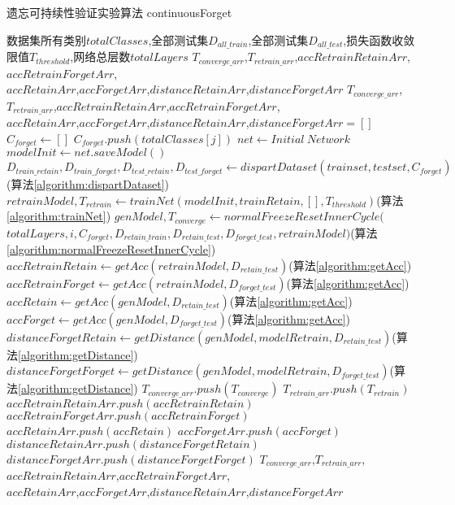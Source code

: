 \begin{algorithm}
	\renewcommand{\algorithmicrequire}{\textbf{Input:}}
	\renewcommand{\algorithmicensure}{\textbf{Output:}}
	\caption{遗忘可持续性验证实验算法 continuousForget}
	\label{algorithm:continuousForget}
	\begin{algorithmic}[1]
        \REQUIRE 数据集所有类别$totalClasses$,全部测试集$D_{all\_train}$,全部测试集$D_{all\_test}$,损失函数收敛限值$T_{threshold}$,网络总层数$totalLayers$
        \ENSURE  $T_{converge\_arr}$,$T_{retrain\_arr}$,$accRetrainRetainArr$,$accRetrainForgetArr$,\\$accRetainArr$,$accForgetArr$,$distanceRetainArr$,$distanceForgetArr$
        \STATE $T_{converge\_arr}$,$T_{retrain\_arr}$,$accRetrainRetainArr$,$accRetrainForgetArr$,\\$accRetainArr$,$accForgetArr$,$distanceRetainArr$,$distanceForgetArr$$ = []$
            \STATE $C_{forget} \gets []$
                \STATE $C_{forget}.push(totalClasses[j])$
            \ENDFOR
            \STATE $net \gets Initial\ Network$
            \STATE $modelInit \gets net.saveModel()$
            \STATE $D_{train\_retain},D_{train\_forget},D_{test\_retain},D_{test\_forget} \gets dispartDataset(trainset, testset, C_{forget})$(算法\ref{algorithm:dispartDataset})
            \STATE $retrainModel,T_{retrain} \gets trainNet(modelInit, trainRetain, [],T_{threshold})$(算法\ref{algorithm:trainNet})
            \STATE $genModel, T_{converge} \gets normalFreezeResetInnerCycle($\\$totalLayers, i, C_{forget},D_{retain\_train},D_{retain\_test}, D_{forget\_test},retrainModel )$(算法\ref{algorithm:normalFreezeResetInnerCycle})
            \STATE $accRetrainRetain \gets getAcc(retrainModel, D_{retain\_test})$(算法\ref{algorithm:getAcc})
            \STATE $accRetrainForget  \gets getAcc(retrainModel, D_{forget\_test})$(算法\ref{algorithm:getAcc})
            \STATE $accRetain \gets getAcc(genModel, D_{retain\_test})$(算法\ref{algorithm:getAcc})
            \STATE $accForget  \gets getAcc(genModel, D_{forget\_test})$(算法\ref{algorithm:getAcc})
            \STATE $distanceForgetRetain \gets getDistance(genModel, modelRetrain,D_{retain\_test})$(算法\ref{algorithm:getDistance})
            \STATE $distanceForgetForget \gets getDistance(genModel, modelRetrain, D_{forget\_test})$(算法\ref{algorithm:getDistance})
            \STATE $T_{converge\_arr}.push(T_{converge})$
            \STATE $T_{retrain\_arr}.push(T_{retrain})$
            \STATE $accRetrainRetainArr.push(accRetrainRetain)$
            \STATE $accRetrainForgetArr.push(accRetrainForget)$
            \STATE $accRetainArr.push(accRetain)$
            \STATE $accForgetArr.push(accForget)$
            \STATE $distanceRetainArr.push(distanceForgetRetain)$
            \STATE $distanceForgetArr.push(distanceForgetForget)$
        \ENDFOR
        \RETURN $T_{converge\_arr}$,$T_{retrain\_arr}$,$accRetrainRetainArr$,$accRetrainForgetArr$,\\$accRetainArr$,$accForgetArr$,$distanceRetainArr$,$distanceForgetArr$
	\end{algorithmic}  
\end{algorithm}
